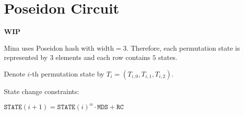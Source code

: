 \section{Poseidon Circuit}
\label{section:poseidon}
\textbf{WIP}

Mina uses Poseidon hash with $\text{width} = 3$.
Therefore, each permutation state is represented by $3$ elements and each row contains $5$ states.


Denote $i$-th permutation state by $T_i = (T_{i, 0}, T_{i, 1}, T_{i, 2})$.

\begin{center}
    \begin{table}[H]
    \end{table}
\end{center}

State change constraints:
\begin{center}
    $\texttt{STATE}(i+1) = \texttt{STATE}(i)^\alpha \cdot \texttt{MDS} + \texttt{RC}$
\end{center}

